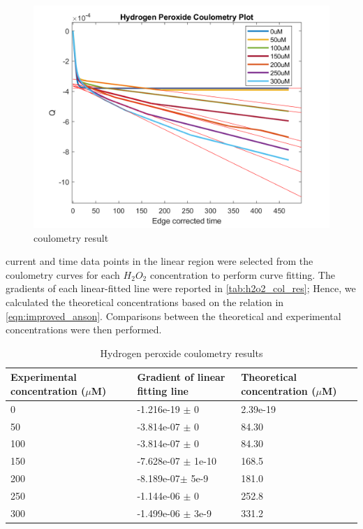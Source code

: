 \begin{figure}[H]
    \centering
    \includegraphics[width=.5\textwidth]{img/h2o2_coulometry.png}
    \caption{coulometry result}
    \label{fig:h2o2_col}
\end{figure}\vspace{-.8cm}
 current and time data points in the linear region were selected from the coulometry curves for each $H_{2}O_{2}$ concentration to perform curve fitting. The gradients of each linear-fitted line were reported in \autoref{tab:h2o2_col_res}; Hence, we calculated the theoretical concentrations based on the relation in \autoref{eqn:improved_anson}. Comparisons between the theoretical and experimental concentrations were then performed.
\begin{table}[H]
    \centering
    \begin{tabularx}{.45\textwidth}{|p{}|p{}|p{}|}\hline
        Experimental concentration ($\mu$M) & Gradient of linear fitting line & Theoretical concentration ($\mu$M)  \\ \hline
        0   & -1.216e-19 $\pm$ 0 & 2.39e-19\\ \hline
        50  & -3.814e-07 $\pm$ 0 & 84.30\\ \hline
        100 & -3.814e-07 $\pm$ 0 & 84.30\\ \hline
        150 & -7.628e-07 $\pm$ 1e-10 & 168.5\\ \hline
        200 &  -8.189e-07$\pm$ 5e-9 & 181.0\\ \hline
        250 & -1.144e-06 $\pm$ 0 & 252.8\\ \hline
        300 & -1.499e-06 $\pm$ 3e-9 & 331.2\\ \hline
    \end{tabularx}
    \caption{Hydrogen peroxide coulometry results}
    \label{tab:h2o2_col_res}
\end{table}

